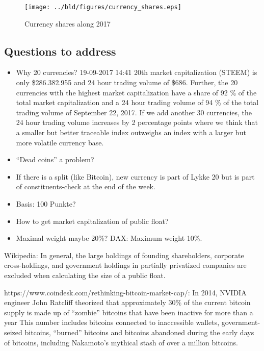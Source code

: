 \documentclass[11pt]{article}
\begin{document}
\begin{figure}%
    \centering%
    \texttt{[image: ../bld/figures/currency\_shares.eps]}%
    \caption{Currency shares along 2017}\label{f:curshares}%
\end{figure}


\subsection{Questions to address}
\begin{itemize}
  \item Why 20 currencies? 19-09-2017 14:41 20th market capitalization (STEEM) is only \$286.382.955 and 24 hour trading volume of \$686. Further, the 20 currencies with the highest market capitalization have a share of 92 \% of the total market capitalization and a 24 hour trading volume of 94 \% of the total trading volume of September 22, 2017. If we add another 30 currencies, the 24 hour trading volume increases by 2 percentage points where we think that a smaller but better traceable index outweighs an index with a larger but more volatile currency base.
  \item ``Dead coins'' a problem?
  \item If there is a split (like Bitcoin), new currency is part of Lykke 20 but is part of constituents-check at the end of the week.
  \item Basis: 100 Punkte?
  \item How to get market capitalization of public float?
  \item Maximal weight maybe 20\%? DAX: Maximum weight 10\%.
\end{itemize}

Wikipedia:  In general, the large holdings of founding shareholders, corporate cross-holdings, and government holdings in partially privatized companies are excluded when calculating the size of a public float.

https://www.coindesk.com/rethinking-bitcoin-market-cap/: In 2014, NVIDIA engineer John Ratcliff theorized that approximately 30\% of the current bitcoin supply is made up of ``zombie'' bitcoins that have been inactive for more than a year This number includes bitcoins connected to inaccessible wallets, government-seized bitcoins, ``burned'' bitcoins and bitcoins abandoned during the early days of bitcoins, including Nakamoto's mythical stash of over a million bitcoins.
\end{document}
